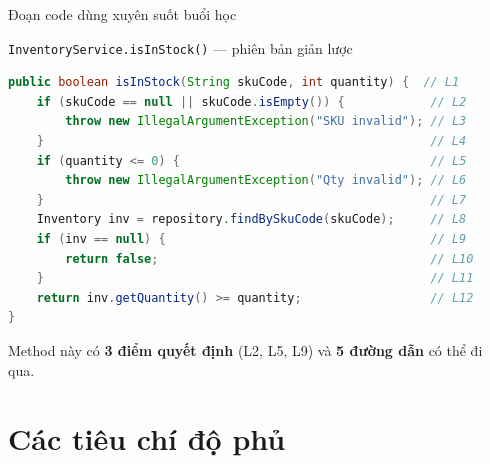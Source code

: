 \documentclass[aspectratio=169,12pt]{beamer}
\begin{document}
\begin{frame}[fragile,shrink=15]{Đoạn code dùng xuyên suốt buổi học}
  \begin{block}{\small \texttt{InventoryService.isInStock()} --- phiên bản giản lược}
\begin{lstlisting}[language=java]
public boolean isInStock(String skuCode, int quantity) {  // L1
    if (skuCode == null || skuCode.isEmpty()) {            // L2
        throw new IllegalArgumentException("SKU invalid"); // L3
    }                                                      // L4
    if (quantity <= 0) {                                   // L5
        throw new IllegalArgumentException("Qty invalid"); // L6
    }                                                      // L7
    Inventory inv = repository.findBySkuCode(skuCode);     // L8
    if (inv == null) {                                     // L9
        return false;                                      // L10
    }                                                      // L11
    return inv.getQuantity() >= quantity;                  // L12
}
\end{lstlisting}
  \end{block}
  \vspace{-0.3em}
  {\small Method này có \textbf{3 điểm quyết định} (L2, L5, L9)
  và \textbf{5 đường dẫn} có thể đi qua.}
\end{frame}

\section{Các tiêu chí độ phủ}
\end{document}
